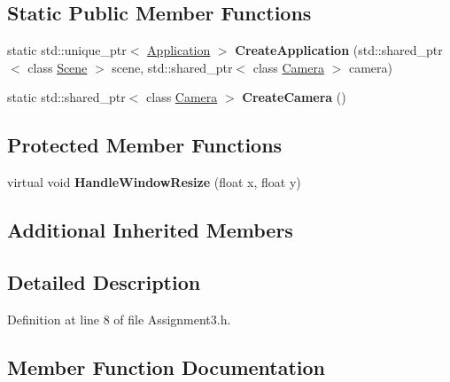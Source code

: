 \subsection*{Static Public Member Functions}
\begin{DoxyCompactItemize}
\item 
\hypertarget{class_assignment3_a12b30bd7b8a0bcefbd977f126ce00b25}{}static std\+::unique\+\_\+ptr$<$ \hyperlink{class_application}{Application} $>$ {\bfseries Create\+Application} (std\+::shared\+\_\+ptr$<$ class \hyperlink{class_scene}{Scene} $>$ scene, std\+::shared\+\_\+ptr$<$ class \hyperlink{class_camera}{Camera} $>$ camera)\label{class_assignment3_a12b30bd7b8a0bcefbd977f126ce00b25}

\item 
\hypertarget{class_assignment3_a47d1b58079eee3e135e08768cd2a2461}{}static std\+::shared\+\_\+ptr$<$ class \hyperlink{class_camera}{Camera} $>$ {\bfseries Create\+Camera} ()\label{class_assignment3_a47d1b58079eee3e135e08768cd2a2461}

\end{DoxyCompactItemize}
\subsection*{Protected Member Functions}
\begin{DoxyCompactItemize}
\item 
\hypertarget{class_assignment3_a851c637c83c8092d8adfb5c9f761daeb}{}virtual void {\bfseries Handle\+Window\+Resize} (float x, float y)\label{class_assignment3_a851c637c83c8092d8adfb5c9f761daeb}

\end{DoxyCompactItemize}
\subsection*{Additional Inherited Members}


\subsection{Detailed Description}


Definition at line 8 of file Assignment3.\+h.



\subsection{Member Function Documentation}
\hypertarget{class_assignment3_a895e38d50717c935706a719f4368f5e8}{}
